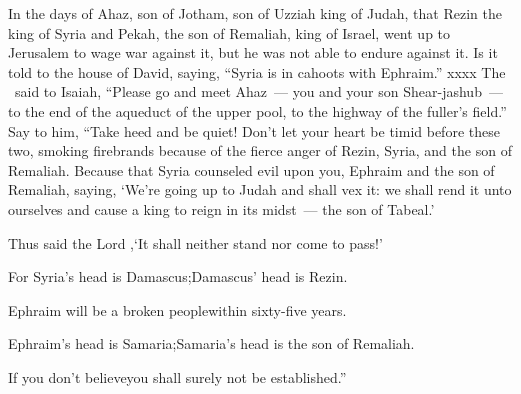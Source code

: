 
\begin{inparaenum}
   In the days of Ahaz, son of Jotham, son of Uzziah king of Judah, that Rezin the king of Syria and Pekah, the son of Remaliah, king of Israel, went up to Jerusalem to wage war against it, but he was not able to%
  endure against it.%
   Is it told to the house of David, saying, ``Syria is in cahoots with Ephraim.'' xxxx%
   The \lord\ said to Isaiah, ``Please go and meet Ahaz~--- you and your son Shear-jashub~--- to the end of the aqueduct of the upper pool, to the highway of the fuller's field.''%
   Say to him, ``Take heed and be quiet! Don't let your heart be timid before these two, smoking firebrands because of the fierce anger of Rezin, Syria, and the son of Remaliah.%
   Because that Syria counseled evil upon you, Ephraim and the son of Remaliah, saying,%
   `We're going up to Judah and shall vex it: we shall rend it unto ourselves and cause a king to reign in its midst~--- the son of Tabeal.'\smallskip%

  \pa{} Thus said the Lord \god,\pa{}`It shall neither stand nor come to pass!'%

  \pa{} For Syria's head is Damascus;\pa{}Damascus' head is Rezin.%

  \pb{}Ephraim will be a broken people\pa{}within sixty-five years.%

  \pa{} Ephraim's head is Samaria;\pa{}Samaria's head is the son of Remaliah.%

  \pb{}If you don't believe\pa{}you shall surely not be established.''\smallskip%


\end{inparaenum}
